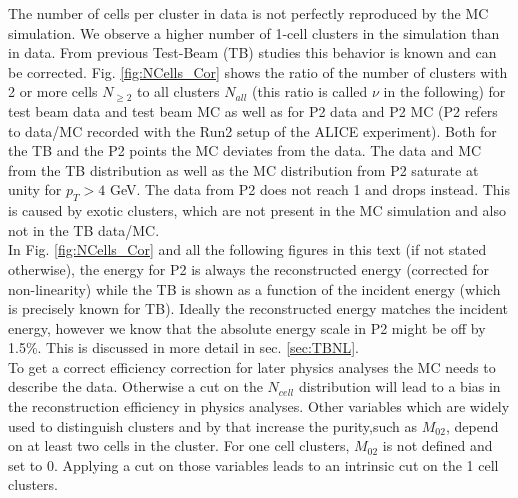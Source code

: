 \documentclass[ALICE]{ALICE_analysis_notes}
\begin{document}
The number of cells per cluster in data is not perfectly reproduced by the MC simulation. We observe a higher number of 1-cell clusters in the simulation than in data. From previous Test-Beam (TB) studies this behavior is known and can be corrected. 
Fig. \ref{fig:NCells_Cor} shows the ratio of the number of clusters with 2 or more cells $N_{\geq 2}$ to all clusters $N_{all}$ (this ratio is called $\nu$  in the following) for test beam data and test beam MC as well as for P2 data and P2 MC (P2 refers to data/MC recorded with the Run2 setup of the ALICE experiment). Both for the TB and the P2 points the MC deviates from the data. The data and MC from the TB distribution as well as the MC distribution from P2 saturate at unity for $p_{T} > 4$ GeV. The data from P2 does not reach 1 and drops instead. This is caused by exotic clusters, which are not present in the MC simulation and also not in the TB data/MC.\\
In Fig. \ref{fig:NCells_Cor} and all the following figures in this text (if not stated otherwise), the energy for P2 is always the reconstructed energy (corrected for non-linearity) while the TB is shown as a function of the incident energy (which is precisely known for TB). Ideally the reconstructed energy matches the incident energy, however we know that the absolute energy scale in P2 might be off by 1.5\%. This is discussed in more detail in sec. \ref{sec:TBNL}.\\
To get a correct efficiency correction for later physics analyses the MC needs to describe the data. Otherwise a cut on the $N_{cell}$ distribution will lead to a bias in the reconstruction efficiency in physics analyses. Other variables which are widely used to distinguish clusters and by that increase the purity,such as $M_{02}$, depend on at least two cells in the cluster. For one cell clusters, $M_{02}$ is not defined and set to 0. Applying a cut on those variables leads to an intrinsic cut on the 1 cell clusters.\\
\end{document}
